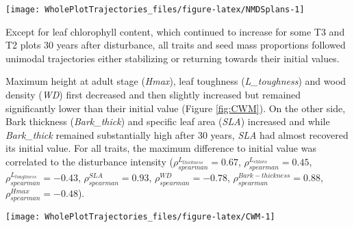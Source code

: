 \documentclass[fleqn,10pt]{ArtEcoFoG} %
\begin{document}
\begin{figure*}

{\centering \texttt{[image: WholePlotTrajectories\_files/figure-latex/NMDSplans-1]} 

}

\caption{Plot trajectories in terms of flora composition (left panels \textbf{(a)} and \textbf{(c)}) and functional composition (right panels \textbf{(b)} and \textbf{(d)}) in a two-dimensional NMDS space. Lower panels (\textbf{(c)} and \textbf{(d)}) represent the euclidean distance to initial condition along the 30 sampled years. Colors are treatments: green (control), blue (T1), orange (T2), red (T3) with shaded areas the credibility intervals}\label{fig:NMDSplans}
\end{figure*}

Except for leaf chlorophyll content, which continued to increase for
some T3 and T2 plots 30 years after disturbance, all traits and seed
mass proportions followed unimodal trajectories either stabilizing or
returning towards their initial values.

Maximum height at adult stage (\emph{Hmax}), leaf toughness
(\emph{L\_toughness}) and wood density (\emph{WD}) first decreased and
then slightly increased but remained significantly lower than their
initial value (Figure \ref{fig:CWM}). On the other side, Bark thickness
(\emph{Bark\_thick}) and specific leaf area (\emph{SLA}) increased and
while \emph{Bark\_thick} remained substantially high after 30 years,
\emph{SLA} had almost recovered its initial value. For all traits, the
maximum difference to initial value was correlated to the disturbance
intensity (\(\rho_{spearman}^{L_{thickness}}=0.67\),
\(\rho_{spearman}^{L_{chloro}}=0.45\),
\(\rho_{spearman}^{L_{toughness}}=-0.43\),
\(\rho_{spearman}^{SLA}=0.93\), \(\rho_{spearman}^{WD}=-0.78\),
\(\rho_{spearman}^{Bark-thickness}=0.88\),
\(\rho_{spearman}^{Hmax}=-0.48\)).

\begin{figure*}

{\centering \texttt{[image: WholePlotTrajectories\_files/figure-latex/CWM-1]} 

}

\caption{Trajectories of the communities weighted means (CWM) over 30 years after disturbance of 4 leaf traits (Leaf thickness, \emph{L\_thickness}, chlorophyll content, \emph{L\_chloro}, toughness, \emph{L\_toughness} and specific area, \emph{SLA}), 2 stem traits (wood specific gravity, \emph{WD}, and bark thickness, \emph{Bark-thick}) and one life history trait (Specific maximum height at adult stage, \emph{Hmax}). Colors are treatments: green (control), blue (T1), orange (T2), red (T3) with shaded areas the credibility intervals.}\label{fig:CWM}
\end{figure*}
\end{document}
